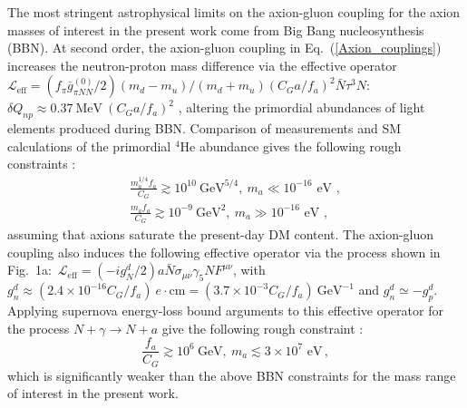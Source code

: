 The most stringent astrophysical limits on the axion-gluon coupling for the axion masses of interest in the present work come from Big Bang nucleosynthesis (BBN).
At second order, the axion-gluon coupling in Eq.~(\ref{Axion_couplings}) increases the neutron-proton mass difference via the effective operator $\mathcal{L}_{\textrm{eff}} = (f_\pi \bar{g}^{(0)}_{\pi N N} / 2) (m_d - m_u)/ (m_d + m_u) (C_G a / f_a)^2 \bar{N} \tau^3 N$:~$\delta Q_{np} \approx 0.37~\textrm{MeV}~\left(C_G a / f_a \right)^2$ \cite{Ubaldi2010,Blum2014}, altering the primordial abundances of light elements produced during BBN.
Comparison of measurements and SM calculations of the primordial $^4$He abundance gives the following rough constraints \cite{Blum2014}:
\begin{eqnarray}
\label{aGG_BBN_limits}
\frac{m_a^{1/4} f_a}{ C_G} \gtrsim 10^{10}~\textrm{GeV}^{5/4}, ~ \textrm{$m_a \ll 10^{-16}$ eV },\\
\frac{m_a f_a}{ C_G} \gtrsim 10^{-9}~\textrm{GeV}^2, ~ \textrm{$m_a \gg 10^{-16}$ eV },
\end{eqnarray}
assuming that axions saturate the present-day DM content.
The axion-gluon coupling also induces the following effective operator via the process shown in Fig.~1a:~$\mathcal{L}_{\textrm{eff}} = (-i g^d_N / 2) a \bar{N} \sigma_{\mu \nu} \gamma_5 N F^{\mu \nu}$, with $g^d_n \approx (2.4 \times 10^{-16} C_G / f_a) ~ e \cdot \textrm{cm} = (3.7 \times 10^{-3} C_G / f_a) ~\textrm{GeV}^{-1}$ and $g^d_n \simeq - g^d_p$.
Applying supernova energy-loss bound arguments to this effective operator for the process $N + \gamma \to N + a$ give the following rough constraint \cite{Graham2013}:
\begin{equation}
\label{aGG_SN_limits}
\frac{f_a}{C_G} \gtrsim 10^6 ~\textrm{GeV}, ~ \textrm{$m_a \lesssim 3 \times 10^{7}$ eV} \, ,
\end{equation}
which is significantly weaker than the above BBN constraints for the mass range of interest in the present work.



